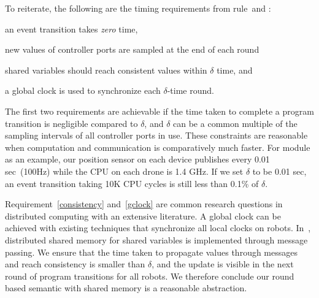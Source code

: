 To reiterate, the following are the timing requirements from rule~\EventTransRule and \EnvTransRule:
\begin{inparaenum}[(a)]
\item an event transition takes \emph{zero} time,
\item new values of controller ports are sampled at the end of each round
\item \label{consistency} shared variables should reach consistent values within $\delta$ time, and
\item \label{gclock} a global clock is used to synchronize each $\delta$-time round.
\end{inparaenum}
The first two requirements are achievable if the time taken to complete a program transition is negligible compared to $\delta$,
and $\delta$ can be a common multiple of the sampling intervals of all controller ports in use.
These constraints are reasonable when computation and communication is comparatively much faster.
For \Motion module as an example, our position sensor on each device publishes every 0.01 sec~(100Hz) while the CPU on each drone is 1.4 GHz.
If we set $\delta$ to be 0.01 sec, an event transition taking 10K CPU cycles is still less than 0.1\% of $\delta$.

Requirement~\eqref{consistency} and~\eqref{gclock} are common research questions in distributed computing with an extensive literature.
A global clock can be achieved with existing techniques that synchronize all local clocks on robots.
In~\cite{ghosh2019cyphyhouse}, distributed shared memory for shared variables is implemented through message passing.
We ensure that the time taken to propagate values through messages and reach consistency is smaller than $\delta$,
and the update is visible in the next round of program transitions for all robots.
We therefore conclude our round based semantic with shared memory is a reasonable abstraction.
